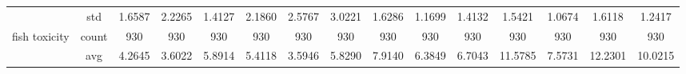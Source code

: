 \begin{table}[htbp]
{\begin{tabular}{rcccc|c|c|c|c|c|ccccc}
			                                                                               & std                                    & 1.6587                                                                             & 2.2265                                                                    & 1.4127                                                                    & 2.1860                                         & 2.5767                                                                    & 3.0221                                       & 1.6286                                      & 1.1699                                         & 1.4132                                         & 1.5421                                          & 1.0674                                          & 1.6118                                         & 1.2417                                         \\
			fish toxicity                                                                  & count                                  & 930                                                                                & 930                                                                       & 930                                                                       & 930                                            & 930                                                                       & 930                                          & 930                                         & 930                                            & 930                                            & 930                                             & 930                                             & 930                                            & 930                                            \\
			                                                                               & avg                                    & 4.2645                                                                             & 3.6022                                                                    & 5.8914                                                                    & 5.4118                                         & \cellcolor[rgb]{ .776,  .937,  .808}\textcolor[rgb]{ 0,  .38,  0}{3.5946} & 5.8290                                       & 7.9140                                      & 6.3849                                         & 6.7043                                         & 11.5785                                         & 7.5731                                          & 12.2301                                        & 10.0215                                        \\

\end{tabular}}
\end{table}
